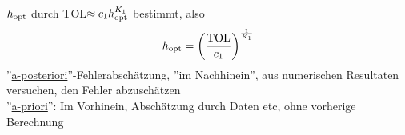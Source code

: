 \documentclass[../Skript.tex]{subfiles}
\begin{document}
{$h_{\text{opt}}$ durch TOL$\approx c_1 h_{\text{opt}}^{K_1}$ bestimmt, also \[
    h_{\text{opt}} = \left(\frac{\text{TOL}}{c_1}\right)^{\frac{1}{K_1}}\]
''\underline{a-posteriori}''-Fehlerabschätzung, ''im Nachhinein'', aus 
numerischen Resultaten 
versuchen, den Fehler abzuschätzen\\
''\underline{a-priori}'': Im Vorhinein, Abschätzung durch Daten etc, ohne 
vorherige Berechnung



}
\end{document}
